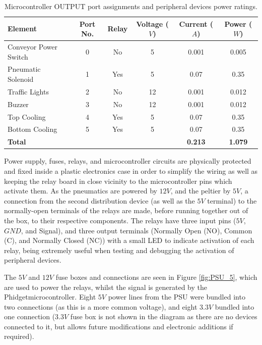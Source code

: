 \documentclass[fleqn,twoside,12pt]{report}
\begin{document}
\renewcommand{\arraystretch}{0.8}%
\begin{table}[h]
	\centering
	\caption{Microcontroller OUTPUT port assignments and peripheral devices power ratings.}
	\label{tab:micro_pinout_out}
	\begin{tabular}{lccccc}
		\toprule
		\textbf{Element}  & \textbf{Port No.}  & \textbf{Relay} & \textbf{Voltage ($V$)} & \textbf{Current ($A$)} & \textbf{Power ($W$)}\\[8pt]
		\midrule
		Conveyor Power Switch 	& 0 & No & 5 & 0.001 & 0.005 \\[4pt]
		\midrule
		Pneumatic Solenoid 		& 1 & Yes & 5 & 0.07 & 0.35 \\[4pt]
		\midrule
		Traffic Lights 			& 2 & No & 12 & 0.001 & 0.012 \\[4pt]
		\midrule
		Buzzer 					& 3 & No & 12 & 0.001 & 0.012 \\[4pt]
		\midrule
		Top Cooling 			& 4 & Yes & 5 & 0.07 & 0.35 \\[4pt]
		\midrule
		Bottom Cooling 			& 5 & Yes & 5 & 0.07 & 0.35 \\[4pt]
		\midrule
		\textbf{Total} 			&    &     &   & \textbf{0.213} & \textbf{1.079} \\[4pt]
		\bottomrule
		
	\end{tabular}
\end{table}


Power supply, fuses, relays, and microcontroller circuits are physically protected and fixed inside a plastic electronics case in order to simplify the wiring as well as keeping the relay board in close vicinity to the microcontroller pins which activate them. As the pneumatics are powered by $12V$, and the peltier by $5V$, a connection from the second distribution device (as well as the $5V$ terminal) to the normally-open terminals of the relays are made, before running together out of the box, to their respective components. The relays have three input pins ($5V$, $GND$, and Signal), and three output terminals (Normally Open (NO), Common (C), and Normally Closed (NC)) with a small LED to indicate activation of each relay, being extremely useful when testing and debugging the activation of peripheral devices. 

The $5V$ and $12V$ fuse boxes and connections are seen in Figure \ref{fig:PSU_5}, which are used to power the relays, whilst the signal is generated by the Phidget\texttrademark microcontroller. Eight $5V$ power lines from the PSU were bundled into two connections (as this is a more common voltage), and eight $3.3V$ bundled into one connection ($3.3V$ fuse box is not shown in the diagram as there are no devices connected to it, but allows future modifications and electronic additions if required). 
\end{document}
